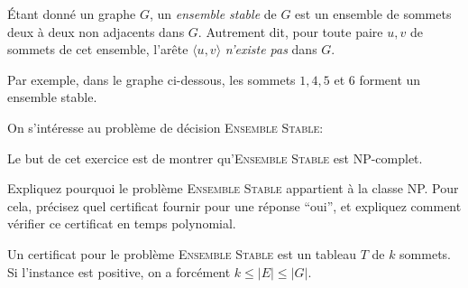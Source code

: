 
\begingroup

\begin{exercice}

  Étant donné un graphe $G$, un {\em ensemble stable} de $G$ est un ensemble de sommets deux à deux non adjacents dans $G$.
  Autrement dit, pour toute paire $u, v$ de sommets de cet ensemble, l'arête $\langle u, v\rangle$ {\em n'existe pas} dans $G$.

  Par exemple, dans le graphe ci-dessous, les sommets $1, 4, 5$ et $6$ forment un ensemble stable.

  \begin{center}
  \end{center}

  On s'intéresse au problème de décision \textsc{Ensemble Stable}:


  Le but de cet exercice est de montrer qu'\textsc{Ensemble Stable} est NP-complet.
  
  \begin{questions}
  \item\label{ex3.Q8} Expliquez pourquoi le problème \textsc{Ensemble Stable} appartient à la classe NP.
    Pour cela, précisez quel certificat fournir pour une réponse ``oui'', et expliquez comment vérifier ce certificat en temps polynomial.
  \end{questions}
  \begin{corrections}
    Un certificat pour le problème \textsc{Ensemble Stable} est un tableau $T$ de $k$ sommets. Si l'instance est positive, on a forcément $k \le |E| \le |G|$.
    

\end{corrections}
\end{exercice}
